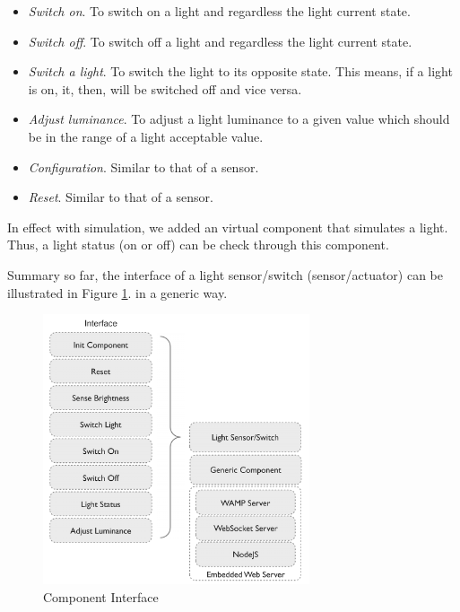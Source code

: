 \begin{itemize}
\setlength{\itemsep}{0pt}
\item \emph{Switch on}. To switch on a light and regardless the light current state.
\item \emph{Switch off}. To switch off a light and regardless the light current state.
\item \emph{Switch a light}. To switch the light to its opposite state. This means, if a light is on, it, then, will be switched off and vice versa.
\item \emph{Adjust luminance}. To adjust a light luminance to a given value which should be in the range of a light acceptable value.
\item \emph{Configuration}. Similar to that of a sensor.
\item \emph{Reset}. Similar to that of a sensor.
\end{itemize}

In effect with simulation, we added an virtual component that simulates a light. Thus, a light status (on or off) can be check through this component. 

Summary so far, the interface of a light sensor/switch (sensor/actuator) can be illustrated in Figure \ref{fig:component-interface}. in a generic way.

\begin{figure}[ht]
  \begin{center}
    \includegraphics[width=0.7\textwidth]{images/component-interface.pdf}
    \caption{Component Interface}
    \label{fig:component-interface}
  \end{center}
\end{figure}

